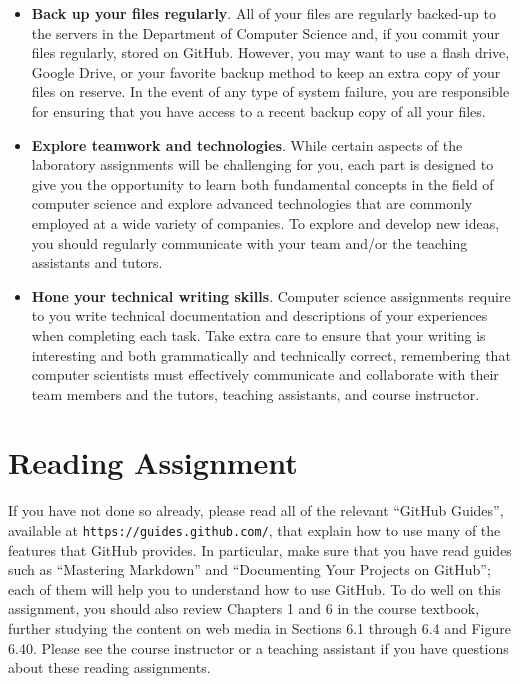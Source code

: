 \documentclass[11pt]{article}
\newcommand{\url}[1]{\lstinline{#1}}
\begin{document}
\begin{itemize}
\item {\bf Back up your files regularly}. All of your files are regularly
  backed-up to the servers in the Department of Computer Science and, if you
  commit your files regularly, stored on GitHub. However, you may want to use a
  flash drive, Google Drive, or your favorite backup method to keep an extra
  copy of your files on reserve. In the event of any type of system failure, you
  are responsible for ensuring that you have access to a recent backup copy of
  all your files.

\item {\bf Explore teamwork and technologies}. While certain aspects of the
  laboratory assignments will be challenging for you, each part is designed to
  give you the opportunity to learn both fundamental concepts in the field of
  computer science and explore advanced technologies that are commonly employed
  at a wide variety of companies. To explore and develop new ideas, you should
  regularly communicate with your team and/or the teaching assistants and
  tutors.

\item {\bf Hone your technical writing skills}. Computer science assignments
  require to you write technical documentation and descriptions of your
  experiences when completing each task. Take extra care to ensure that your
  writing is interesting and both grammatically and technically correct,
  remembering that computer scientists must effectively communicate and
  collaborate with their team members and the tutors, teaching assistants, and
  course instructor.

\end{itemize}

\section*{Reading Assignment}

If you have not done so already, please read all of the relevant ``GitHub
Guides'', available at \url{https://guides.github.com/}, that explain how to use
many of the features that GitHub provides. In particular, make sure that you
have read guides such as ``Mastering Markdown'' and ``Documenting Your Projects
on GitHub''; each of them will help you to understand how to use GitHub. To do
well on this assignment, you should also review Chapters 1 and 6 in the course
textbook, further studying the content on web media in Sections 6.1 through 6.4
and Figure 6.40. Please see the course instructor or a teaching assistant if you
have questions about these reading assignments.
\end{document}
